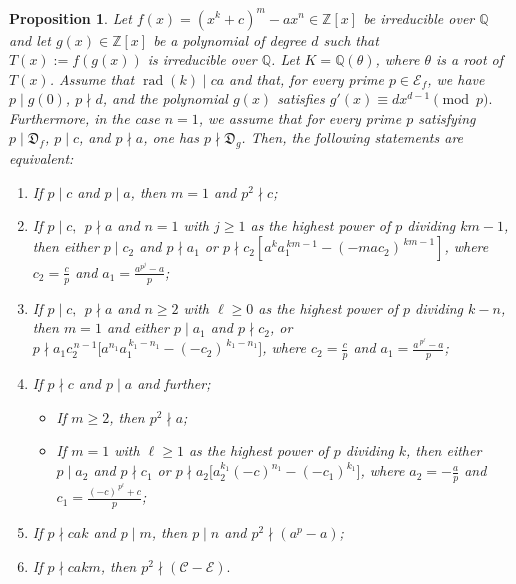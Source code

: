 \documentclass[table]{amsart}
\newcommand{\scrE}{\mathscr{E}}
\newtheorem{proposition}[theorem]{Proposition}
\newcommand{\rad}{\operatorname{rad}}
\newcommand{\Z}{\mathbb{Z}}
\newcommand{\D}{\mathfrak{D}}
\newcommand{\calC}{\mathcal{C}}
\newcommand{\calE}{\mathcal{E}}
\numberwithin{equation}{section}
\begin{document}
\begin{proposition}\label{2.5:pro}
    Let $f(x) = (x^k+c)^m-ax^n\in \mathbb{Z}[x]$ be irreducible over $\mathbb{Q}$ and let  $g(x)\in \Z[x]$ be a polynomial of degree $d$ such that \(T(x) := f(g(x))\) is irreducible over $\mathbb{Q}$.  Let $K = \mathbb{Q}(\theta)$, where $\theta$ is a root of $T(x)$. Assume that $\rad(k)\mid ca$ and that, for every prime $p \in \scrE_f$, we have $p \mid g(0)$, $p \nmid d$, and the polynomial $g(x)$ satisfies \( g'(x) \equiv d x^{d-1} \pmod{p}.\) Furthermore, in the case $n = 1$, we assume that for every prime $p$ satisfying 
$p \mid \D_f$, $p \mid c$, and $p \nmid a$, one has $p \nmid \D_g$.
 Then, the following statements are equivalent:
    \begin{enumerate}[label=\textup{(\roman{enumi})}]
    \item  If $p\mid c$  and $p\mid a$, then $m=1$ and $p^2\nmid c$;
    \item  If $p\mid c,~~p\nmid a$ and $n=1$  with $j\geq 1$ as the highest power of $p$ dividing $km-1$, then either $p\mid c_2$ and $p\nmid a_1$ or $p\nmid c_2[a^ka_1^{\,km-1}-(-mac_2)^{\,km-1}]$, where $c_2=\frac{c}{p}$ and $a_1=\frac{a^{p^j}-a}{p}$;
    \item  If $p\mid c,~~p\nmid a$ and $n\geq 2$ with $\ell\geq 0$ as the highest power of $p$ dividing $k-n$, then $m=1$ and  either
$p\mid a_{1}$ and $p\nmid c_{2}$, or $p\nmid a_{1}c_{2}^{\,n-1}
\bigl[a^{n_1}a_{1}^{\,k_1-n_1}-(-c_{2})^{\,k_1-n_1}\bigr]$, where $c_2=\frac{c}{p}$ and $a_1=\frac{a^{\,p^{\ell}}-a}{p}$;
    \item  If $p\nmid c$ and $p\mid a$ and further;
    \begin{itemize}
        \item[\textup{(a)}] If $m\geq 2$, then $p^2\nmid a$;
        \item [\textup{(b)}] If $m=1$ with $\ell\geq 1$ as the highest power of $p$ dividing $k$, then either $p\mid a_2$ and $p\nmid c_1$ or $p\nmid a_2\bigl[a_{2}^{k_{1}}(-c)^{n_{1}}-(-c_{1})^{k_{1}}\bigr]$, where $a_2=-\frac{a}{p}$ and $c_1=\frac{(-c)^{\,p^{\ell}}+c}{p}$;
    \end{itemize}
     \item If $p\nmid cak$ and $p\mid m$, then $p \mid n$ and $p^2\nmid (a^{p}-a)$;
    \item  If $p\nmid cakm$, then $p^2\nmid (\calC-\calE).$
	\end{enumerate}
\end{proposition}
\end{document}
